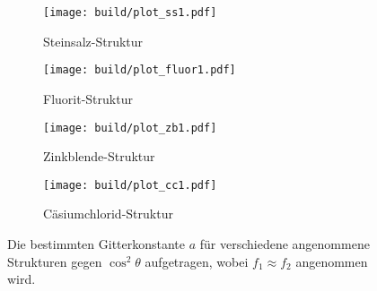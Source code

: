 \begin{figure}[hhh]
  \centering
  \begin{subfigure}{.45\textwidth}
    \centering
    \texttt{[image: build/plot\_ss1.pdf]}
    \caption{Steinsalz-Struktur}
    \label{subfig:ss1}
  \end{subfigure}
  \begin{subfigure}{.45\textwidth}
    \centering
    \texttt{[image: build/plot\_fluor1.pdf]}
    \caption{Fluorit-Struktur}
    \label{subfig:fluo1}
  \end{subfigure}
  \begin{subfigure}{.45\textwidth}
    \centering
    \texttt{[image: build/plot\_zb1.pdf]}
    \caption{Zinkblende-Struktur}
    \label{subfig:zb1}
  \end{subfigure}
  \begin{subfigure}{.45\textwidth}
    \centering
    \texttt{[image: build/plot\_cc1.pdf]}
    \caption{Cäsiumchlorid-Struktur}
    \label{subfig:cc1}
  \end{subfigure}
  \caption{Die bestimmten Gitterkonstante $a$ für verschiedene angenommene Strukturen gegen $\cos^2\theta$ aufgetragen, wobei
  $f_1\approx f_2$ angenommen wird.}
  \label{fig:salz1}
\end{figure}


